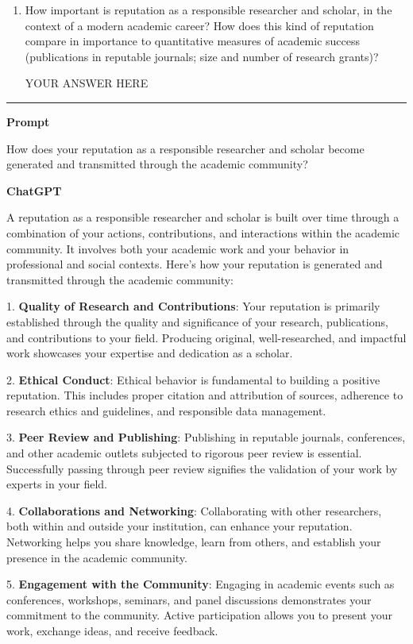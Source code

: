 \documentclass[12pt]{article}
\begin{document}
\begin{enumerate}
YOUR ANSWER HERE

\item How important is reputation as a responsible researcher and scholar, in the context of a modern academic career? How does this kind of reputation compare in importance to quantitative measures of academic success (publications in reputable journals; size and number of research grants)? 

YOUR ANSWER HERE

\end{enumerate}

\hrule

{\bf Prompt}

How does your reputation as a responsible researcher and scholar become generated and transmitted through the academic community?

{\bf ChatGPT}

A reputation as a responsible researcher and scholar is built over time through a combination of your actions, contributions, and interactions within the academic community. It involves both your academic work and your behavior in professional and social contexts. Here's how your reputation is generated and transmitted through the academic community:

1. {\bf Quality of Research and Contributions}: Your reputation is primarily established through the quality and significance of your research, publications, and contributions to your field. Producing original, well-researched, and impactful work showcases your expertise and dedication as a scholar.

2. {\bf Ethical Conduct}: Ethical behavior is fundamental to building a positive reputation. This includes proper citation and attribution of sources, adherence to research ethics and guidelines, and responsible data management.

3. {\bf Peer Review and Publishing}: Publishing in reputable journals, conferences, and other academic outlets subjected to rigorous peer review is essential. Successfully passing through peer review signifies the validation of your work by experts in your field.

4. {\bf Collaborations and Networking}: Collaborating with other researchers, both within and outside your institution, can enhance your reputation. Networking helps you share knowledge, learn from others, and establish your presence in the academic community.

5. {\bf Engagement with the Community}: Engaging in academic events such as conferences, workshops, seminars, and panel discussions demonstrates your commitment to the community. Active participation allows you to present your work, exchange ideas, and receive feedback.
\end{document}
